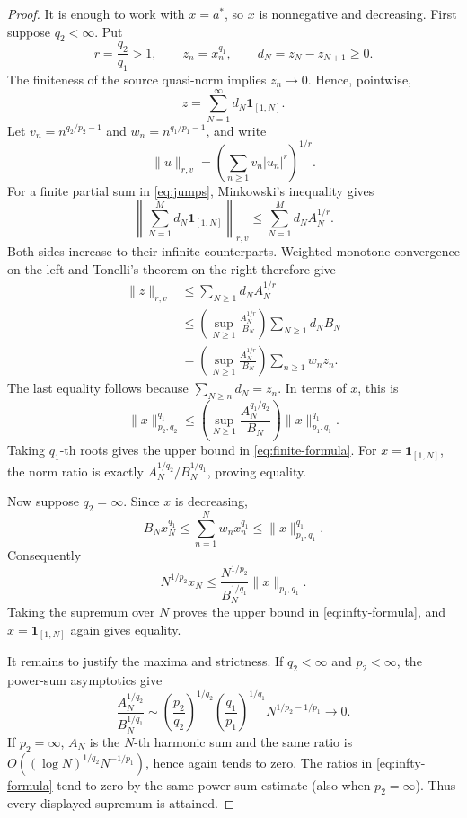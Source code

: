 \documentclass[11pt]{article}
\newcommand{\ind}{\mathbf{1}}
\begin{document}
\begin{proof}
It is enough to work with $x=a^*$, so $x$ is nonnegative and decreasing.
First suppose $q_2<\infty$. Put
\[
 r=\frac{q_2}{q_1}>1,
 \qquad z_n=x_n^{q_1},
 \qquad d_N=z_N-z_{N+1}\geq0.
\]
The finiteness of the source quasi-norm implies $z_n\to0$. Hence, pointwise,
\begin{equation}\label{eq:jumps}
 z=\sum_{N=1}^{\infty}d_N\ind_{[1,N]}.
\end{equation}
Let $v_n=n^{q_2/p_2-1}$ and $w_n=n^{q_1/p_1-1}$, and write
\[
 \|u\|_{r,v}=\left(\sum_{n\geq1}v_n|u_n|^r\right)^{1/r}.
\]
For a finite partial sum in \eqref{eq:jumps}, Minkowski's inequality gives
\[
 \left\|\sum_{N=1}^M d_N\ind_{[1,N]}\right\|_{r,v}
 \leq\sum_{N=1}^M d_N A_N^{1/r}.
\]
Both sides increase to their infinite counterparts. Weighted monotone
convergence on the left and Tonelli's theorem on the right therefore give
\begin{align*}
 \|z\|_{r,v}
 &\leq \sum_{N\geq1}d_N A_N^{1/r}\\
 &\leq
 \left(\sup_{N\geq1}\frac{A_N^{1/r}}{B_N}\right)
 \sum_{N\geq1}d_NB_N\\
 &=\left(\sup_{N\geq1}\frac{A_N^{1/r}}{B_N}\right)
 \sum_{n\geq1}w_nz_n.
\end{align*}
The last equality follows because
$\sum_{N\geq n}d_N=z_n$. In terms of $x$, this is
\[
 \|x\|_{p_2,q_2}^{q_1}
 \leq
 \left(\sup_{N\geq1}\frac{A_N^{q_1/q_2}}{B_N}\right)
 \|x\|_{p_1,q_1}^{q_1}.
\]
Taking $q_1$-th roots gives the upper bound in
\eqref{eq:finite-formula}. For $x=\ind_{[1,N]}$, the norm ratio is exactly
$A_N^{1/q_2}/B_N^{1/q_1}$, proving equality.

Now suppose $q_2=\infty$. Since $x$ is decreasing,
\[
 B_Nx_N^{q_1}
 \leq\sum_{n=1}^Nw_nx_n^{q_1}
 \leq\|x\|_{p_1,q_1}^{q_1}.
\]
Consequently
\[
 N^{1/p_2}x_N
 \leq\frac{N^{1/p_2}}{B_N^{1/q_1}}\|x\|_{p_1,q_1}.
\]
Taking the supremum over $N$ proves the upper bound in
\eqref{eq:infty-formula}, and $x=\ind_{[1,N]}$ again gives equality.

It remains to justify the maxima and strictness. If $q_2<\infty$ and
$p_2<\infty$, the power-sum asymptotics give
\[
 \frac{A_N^{1/q_2}}{B_N^{1/q_1}}
 \sim
 \left(\frac{p_2}{q_2}\right)^{1/q_2}
 \left(\frac{q_1}{p_1}\right)^{1/q_1}
 N^{1/p_2-1/p_1}\longrightarrow0.
\]
If $p_2=\infty$, $A_N$ is the $N$-th harmonic sum and the same ratio is
$O((\log N)^{1/q_2}N^{-1/p_1})$, hence again tends to zero. The ratios in
\eqref{eq:infty-formula} tend to zero by the same power-sum estimate (also
when $p_2=\infty$). Thus every displayed supremum is attained.


\end{proof}
\end{document}
